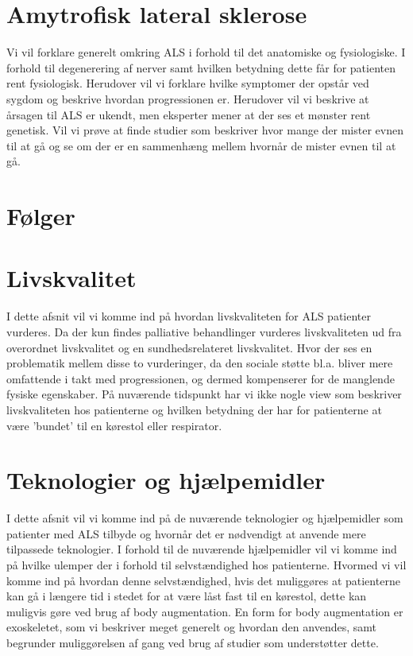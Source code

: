 \section{Amytrofisk lateral sklerose}
Vi vil forklare generelt omkring ALS i forhold til det anatomiske og fysiologiske. I forhold til degenerering af nerver samt hvilken betydning dette får for patienten rent fysiologisk. Herudover vil vi forklare hvilke symptomer der opstår ved sygdom og beskrive hvordan progressionen er. Herudover vil vi beskrive at årsagen til ALS er ukendt, men eksperter mener at der ses et mønster rent genetisk. Vil vi prøve at finde studier som beskriver hvor mange der  mister evnen til at gå og se om der er en sammenhæng mellem hvornår de mister evnen til at gå. 

\section{Følger}


\section{Livskvalitet}
I dette afsnit vil vi komme ind på hvordan livskvaliteten for ALS patienter vurderes. Da der kun findes palliative behandlinger vurderes livskvaliteten ud fra overordnet livskvalitet og en sundhedsrelateret livskvalitet. Hvor der ses en problematik mellem disse to vurderinger, da den sociale støtte bl.a. bliver mere omfattende i takt med progressionen, og dermed kompenserer for de manglende fysiske egenskaber. På nuværende tidspunkt har vi ikke nogle view som beskriver livskvaliteten hos patienterne og hvilken betydning der har for patienterne at være 'bundet' til en kørestol eller respirator. 

\section{Teknologier og hjælpemidler}
I dette afsnit vil vi komme ind på de nuværende teknologier og hjælpemidler som patienter med ALS tilbyde og hvornår det er nødvendigt at anvende mere tilpassede teknologier. I forhold til de nuværende hjælpemidler vil vi komme ind på hvilke ulemper der i forhold til selvstændighed hos patienterne. Hvormed vi vil komme ind på hvordan denne selvstændighed, hvis det muliggøres at patienterne kan gå i længere tid i stedet for at være låst fast til en kørestol, dette kan muligvis gøre ved brug af body augmentation. En form for body augmentation er exoskeletet, som vi beskriver meget generelt og hvordan den anvendes, samt begrunder muliggørelsen af gang ved brug af studier som understøtter dette. 

